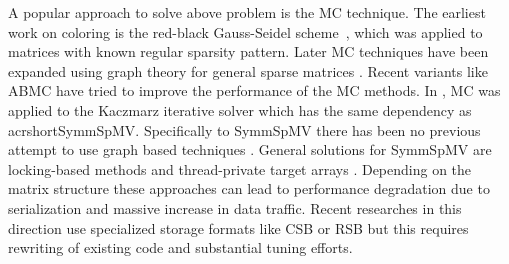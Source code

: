 A popular approach to solve above problem is the
\acrfull{MC} technique. The earliest work on coloring is the red-black 
Gauss-Seidel scheme~\cite{RBGS}, which was applied to  matrices with
 known regular sparsity pattern. 
Later \acrlong{MC} techniques have been expanded using graph theory
for general sparse matrices \cite{MC, COLPACK}.
Recent variants like \acrfull{ABMC} \cite{ABMC} have tried to improve the performance 
of the \acrshort{MC} methods. 
In \cite{feast_mc}, \acrshort{MC} was applied to the Kaczmarz iterative solver {} which has the same \DTWO dependency as acrshort{SymmSpMV}.
Specifically to \acrshort{SymmSpMV} there has been no previous attempt to use 
graph based techniques {} . General solutions for \acrshort{SymmSpMV} are 
locking-based methods and thread-private target arrays \cite{sparseX,thread_private_symm_spmv}.
Depending on the matrix structure these approaches can lead to performance
 degradation  due to serialization and massive increase in data traffic.
Recent researches in this direction use specialized storage formats like
 CSB \cite{CSB} or RSB \cite{RSB} but this requires rewriting of existing 
 code and substantial tuning efforts. 

 

